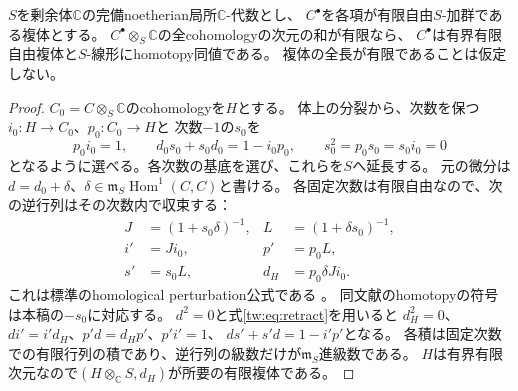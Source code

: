 \begin{lemma}[次数別完備な複体の有限縮約]\label{tw:lem:contraction}
$S$を剰余体$\mathbb C$の完備noetherian局所$\mathbb C$-代数とし、
$C^\bullet$を各項が有限自由$S$-加群である複体とする。
$C^\bullet\otimes_S\mathbb C$の全cohomologyの次元の和が有限なら、
$C^\bullet$は有界有限自由複体と$S$-線形にhomotopy同値である。
複体の全長が有限であることは仮定しない。
\end{lemma}
\begin{proof}
$C_0=C\otimes_S\mathbb C$のcohomologyを$H$とする。
体上の分裂から、次数を保つ$i_0:H\to C_0$、$p_0:C_0\to H$と
次数$-1$の$s_0$を
\begin{equation}\label{tw:eq:retract}
 p_0i_0=1,\qquad d_0s_0+s_0d_0=1-i_0p_0,
 \qquad s_0^2=p_0s_0=s_0i_0=0
\end{equation}
となるように選べる。各次数の基底を選び、これらを$S$へ延長する。
元の微分は$d=d_0+\delta$、$\delta\in\mathfrak m_S\operatorname{Hom}^1(C,C)$と書ける。
各固定次数は有限自由なので、次の逆行列はその次数内で収束する：
\begin{equation}\label{tw:eq:perturbation}
 \begin{aligned}
 J&=(1+s_0\delta)^{-1},& L&=(1+\delta s_0)^{-1},\\
 i'&=Ji_0,&p'&=p_0L,\\
 s'&=s_0L,&d_H&=p_0\delta Ji_0.
 \end{aligned}
\end{equation}
これは標準のhomological perturbation公式である
\cite[Theorem~2.3]{TWCrainic}。
同文献のhomotopyの符号は本稿の$-s_0$に対応する。
$d^2=0$と式\eqref{tw:eq:retract}を用いると
$d_H^2=0$、$di'=i'd_H$、$p'd=d_Hp'$、$p'i'=1$、
$ds'+s'd=1-i'p'$となる。
各積は固定次数での有限行列の積であり、逆行列の級数だけが$\mathfrak m_S$進級数である。
$H$は有界有限次元なので$(H\otimes_{\mathbb C}S,d_H)$が所要の有限複体である。
\end{proof}

